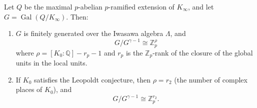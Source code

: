Let $Q$ be the maximal $p$-abelian $p$-ramified extension of $K_\infty$, and let $G = \operatorname{Gal}(Q/K_\infty)$. Then:

\begin{enumerate}
\item[(i)] $G$ is finitely generated over the Iwasawa algebra $\Lambda$, and
$$G/G^{\gamma-1} \cong \mathbb{Z}_p^\rho$$
where $\rho = [K_0 : \mathbb{Q}] - r_p - 1$ and $r_p$ is the $\mathbb{Z}_p$-rank of the closure of the global units in the local units.

\item[(ii)] If $K_0$ satisfies the Leopoldt conjecture, then $\rho = r_2$ (the number of complex places of $K_0$), and
$$G/G^{\gamma-1} \cong \mathbb{Z}_p^{r_2}.$$
\end{enumerate}